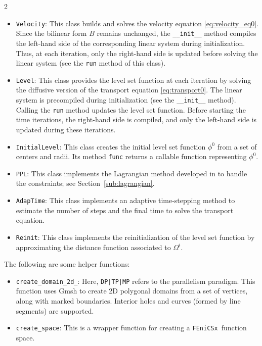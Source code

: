 \documentclass[a4paper, oneside]{article}
\newcommand{\fx}{\texttt{FEniCSx}}
\newcommand{\code}[1]{\texttt{#1}}
\begin{document}
\begin{multicols}{2}
\begin{itemize}[left=0.0em]
\item \code{Velocity}:
This class builds and solves the velocity equation \eqref{eq:velocity_eq0}. 
Since the bilinear form $B$ remains unchanged, the \code{\_\_init\_\_} method
compiles the left-hand side of the corresponding linear system during initialization.
Thus, at each iteration, only the right-hand side is updated before solving
the linear system (see the \code{run} method of this class). 

\item \code{Level}:
This class provides the level set function at each iteration
by solving the diffusive version of the transport equation \eqref{eq:transport0}. 
The linear system is precompiled during initialization
(see the \code{\_\_init\_\_} method). 
Calling the \code{run} method updates the level set function.
Before starting the time iterations, the right-hand side is compiled,
and only the left-hand side is updated during these iterations.

\item \code{InitialLevel}:
This class creates the initial level set function $\phi^0$
from a set of centers and radii.
Its method \code{func} returns a callable function representing $\phi^0$.

\item \code{PPL}:
This class implements the Lagrangian method developed in \cite{MR4589221}
to handle the constraints; see Section~\ref{sub:lagrangian}.

\item \code{AdapTime}:
This class implements an adaptive time-stepping method to
estimate the number of steps and the final time to
solve the transport equation.

\item \code{Reinit}:
This class implements the reinitialization of the level set function
by approximating the distance function associated to $\Omega^i$.
\end{itemize}

The following are some helper functions:
\begin{itemize}[left=0.0em]
\item \code{create\_domain\_2d\_<DP|TP|MP>}:
Here, \code{DP|TP|MP} refers to the parallelism paradigm.
This function uses Gmsh to create 2D polygonal domains 
from a set of vertices, along with marked boundaries.
Interior holes and curves (formed by line segments) are supported.


\item \code{create\_space}:
This is a wrapper function for creating a \fx\ function space.


\end{itemize}
\end{multicols}
\end{document}
